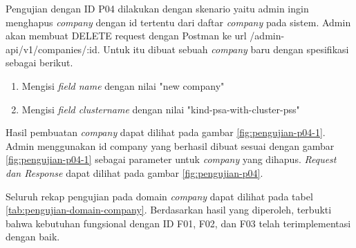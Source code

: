Pengujian dengan ID P04 dilakukan dengan skenario yaitu admin ingin menghapus \textit{company} dengan id tertentu dari daftar \textit{company} pada sistem. Admin akan membuat DELETE request dengan Postman ke url /admin-api/v1/companies/:id. Untuk itu dibuat sebuah \textit{company} baru dengan spesifikasi sebagai berikut.

\begin{enumerate}
  \item Mengisi \textit{field name} dengan nilai "new company"
  \item Mengisi \textit{field cluster\textunderscore name} dengan nilai "kind-psa-with-cluster-pss"
\end{enumerate}

Hasil pembuatan \textit{company} dapat dilihat pada gambar \ref{fig:pengujian-p04-1}. Admin menggunakan id company yang berhasil dibuat sesuai dengan gambar \ref{fig:pengujian-p04-1} sebagai parameter untuk \textit{company} yang dihapus. \textit{Request dan Response} dapat dilihat pada gambar \ref{fig:pengujian-p04}.

Seluruh rekap pengujian pada domain \textit{company} dapat dilihat pada tabel \ref{tab:pengujian-domain-company}. Berdasarkan hasil yang diperoleh, terbukti bahwa kebutuhan fungsional dengan ID F01, F02, dan F03 telah terimplementasi dengan baik.


